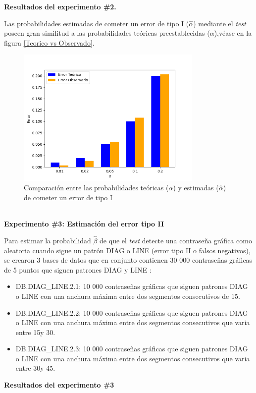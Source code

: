 \documentclass[12pt]{report}
\begin{document}
\textbf{Resultados del experimento \#2.}

Las probabilidades estimadas de cometer un error de tipo I ($\hat{\alpha}$) mediante el \textit{test} poseen gran similitud  a las probabilidades teóricas preestablecidas ($\alpha$),véase en la figura \ref{Teorico vs Observado}.
\begin{figure}[ht]
	\centering
	
	\includegraphics[width=0.8\textwidth]{4td_teo_obs.png}
	\caption{Comparación entre las probabilidades teóricas ($\alpha$) y estimadas ($\hat{\alpha}$) de cometer un error de tipo I }
	\label{Teorico vs Observado1}
\end{figure}\\

\textbf{Experimento \#3: Estimación del error tipo II}

Para estimar la probabilidad $\hat{\beta}$ de que el \textit{test} detecte una contraseña gráfica como aleatoria cuando sigue un patrón DIAG o LINE (error tipo II o falsos negativos), se crearon 3 bases de datos que en conjunto contienen 30 000 contraseñas gráficas de 5 puntos que siguen patrones DIAG y LINE :
\begin{itemize}
	\item DB.DIAG\_LINE.2.1: 10 000 contraseñas gráficas que siguen patrones DIAG o LINE con una anchura máxima entre dos segmentos consecutivos de 15\degree .
	\item DB.DIAG\_LINE.2.2: 10 000 contraseñas gráficas que siguen patrones DIAG o LINE con una anchura máxima entre dos segmentos consecutivos que varia entre 15\degree y 30\degree .
	\item DB.DIAG\_LINE.2.3: 10 000 contraseñas gráficas que siguen patrones DIAG o LINE con una anchura máxima entre dos segmentos consecutivos que varia entre 30\degree y 45\degree .
\end{itemize}
\textbf{Resultados del experimento \#3}
\end{document}
